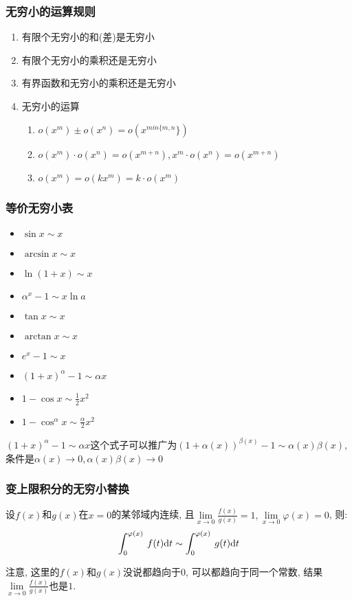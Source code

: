 \subsubsection{无穷小的运算规则}
\begin{enumerate}
\item 有限个无穷小的和(差)是无穷小
\item 有限个无穷小的乘积还是无穷小
\item 有界函数和无穷小的乘积还是无穷小
\item 无穷小的运算 \par 
\begin{enumerate}
\item $ o(x^{m})\pm o(x^{n})=o(x^{min\{m,n}\}) $
\item $ o(x^{m})\cdot o(x^{n})=o(x^{m+n}), x^{m}\cdot o(x^{n})=o(x^{m+n}) $
\item $ o(x^{m})=o(kx^{m})=k\cdot o(x^{m}) $
\end{enumerate}
\end{enumerate}
\subsubsection{等价无穷小表}
\begin{multicols}{2}
\begin{itemize}
\item $ \sin x\sim x $
\item $ \arcsin x\sim x $
\item $ \ln (1+x)\sim x $
\item $ \alpha^{x}-1\sim x\ln a $
\item $ \tan x\sim x $
\item $ \arctan x\sim x $
\item $ e^{x}-1\sim x $
\item $ (1+x)^{\alpha}-1\sim \alpha x $
\item $ 1-\cos x\sim \frac{1}{2}x^{2} $
\item $ 1-\cos^{\alpha} x\sim \frac{\alpha}{2}x^{2} $
\end{itemize}
\end{multicols}
\begin{tcolorbox}
$ (1+x)^{\alpha}-1\sim \alpha x $这个式子可以推广为$ (1+\alpha(x))^{\beta(x)}-1\sim \alpha (x)\beta (x) $, 条件是$ \alpha(x)\rightarrow 0, \alpha(x)\beta(x)\rightarrow 0 $
\end{tcolorbox}
\subsubsection{变上限积分的无穷小替换}
设$ f(x) $和$ g(x) $在$ x=0 $的某邻域内连续, 且$ \lim\limits_{x \rightarrow 0}\frac{f(x)}{g(x)}=1, \lim\limits_{x \rightarrow 0}\varphi(x)=0 $, 则:
\begin{equation*}
\displaystyle\int_{0}^{\varphi(x)}\hspace{.2em}f(t)\mathrm{d}t\sim \displaystyle\int_{0}^{\varphi(x)}\hspace{.2em}g(t)\mathrm{d}t
\end{equation*}\par
注意, 这里的$ f(x) $和$ g(x) $没说都趋向于$ 0 $, 可以都趋向于同一个常数, 结果$ \lim\limits_{x \rightarrow 0}\frac{f(x)}{g(x)} $也是$ 1 $.
